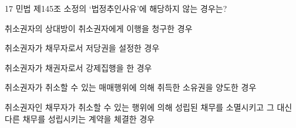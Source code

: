 \begin{question}{17}
민법 제145조 소정의 ‘법정추인사유’에 해당하지 않는 경우는?
\begin{choices}
  \item 취소권자의 상대방이 취소권자에게 이행을 청구한 경우
  \item 취소권자가 채무자로서 저당권을 설정한 경우
  \item 취소권자가 채권자로서 강제집행을 한 경우
  \item 취소권자가 취소할 수 있는 매매행위에 의해 취득한 소유권을 양도한 경우
  \item 취소권자인 채무자가 취소할 수 있는 행위에 의해 성립된 채무를 소멸시키고 그 대신 다른 채무를 성립시키는 계약을 체결한 경우
\end{choices}
\end{question}
